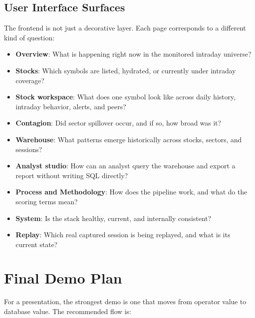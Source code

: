 \documentclass[11pt,a4paper]{article}
\begin{document}
\subsection{User Interface Surfaces}
The frontend is not just a decorative layer. Each page corresponds to a different kind of question:
\begin{itemize}
    \item \textbf{Overview}: What is happening right now in the monitored intraday universe?
    \item \textbf{Stocks}: Which symbols are listed, hydrated, or currently under intraday coverage?
    \item \textbf{Stock workspace}: What does one symbol look like across daily history, intraday behavior, alerts, and peers?
    \item \textbf{Contagion}: Did sector spillover occur, and if so, how broad was it?
    \item \textbf{Warehouse}: What patterns emerge historically across stocks, sectors, and sessions?
    \item \textbf{Analyst studio}: How can an analyst query the warehouse and export a report without writing SQL directly?
    \item \textbf{Process and Methodology}: How does the pipeline work, and what do the scoring terms mean?
    \item \textbf{System}: Is the stack healthy, current, and internally consistent?
    \item \textbf{Replay}: Which real captured session is being replayed, and what is its current state?
\end{itemize}

\section{Final Demo Plan}
For a presentation, the strongest demo is one that moves from operator value to database value. The recommended flow is:
\end{document}
